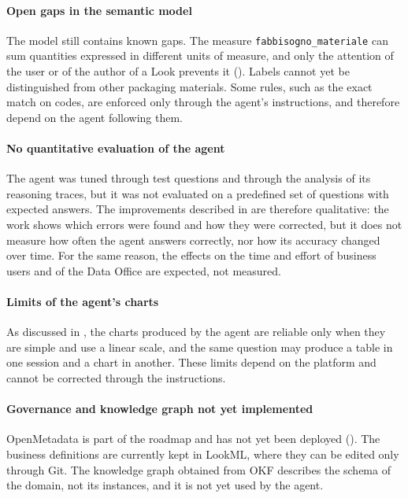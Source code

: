 \paragraph{Open gaps in the semantic model}
The model still contains known gaps. The measure \texttt{fabbisogno\_\allowbreak materiale} can sum quantities expressed in different units of measure, and only the attention of the user or of the author of a Look prevents it (). Labels cannot yet be distinguished from other packaging materials. Some rules, such as the exact match on codes, are enforced only through the agent's instructions, and therefore depend on the agent following them.

\paragraph{No quantitative evaluation of the agent}
The agent was tuned through test questions and through the analysis of its reasoning traces, but it was not evaluated on a predefined set of questions with expected answers. The improvements described in  are therefore qualitative: the work shows which errors were found and how they were corrected, but it does not measure how often the agent answers correctly, nor how its accuracy changed over time. For the same reason, the effects on the time and effort of business users and of the Data Office are expected, not measured.

\paragraph{Limits of the agent's charts}
As discussed in , the charts produced by the agent are reliable only when they are simple and use a linear scale, and the same question may produce a table in one session and a chart in another. These limits depend on the platform and cannot be corrected through the instructions.

\paragraph{Governance and knowledge graph not yet implemented}
OpenMetadata is part of the roadmap and has not yet been deployed (). The business definitions are currently kept in LookML, where they can be edited only through Git. The knowledge graph obtained from OKF describes the schema of the domain, not its instances, and it is not yet used by the agent.

